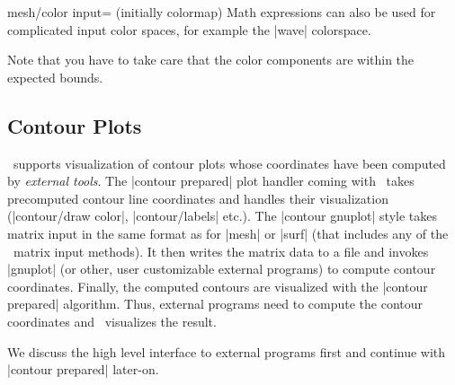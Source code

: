 {{\begin{pgfplotskey}{mesh/color input= (initially colormap)}
Math expressions can also be used for complicated input color spaces, for example the |wave| colorspace.
\begin{codeexample}[]
\end{codeexample}

Note that you have to take care that the color components are within the expected bounds.
\end{pgfplotskey}

}

\subsection{Contour Plots}
{
%
%
\PGFPlots\ supports visualization of contour plots whose coordinates have been computed by \emph{external tools}. The |contour prepared| plot handler coming with \PGFPlots\ takes precomputed contour line coordinates and handles their visualization (|contour/draw color|, |contour/labels| etc.). The |contour gnuplot| style takes matrix input in the same format as for |mesh| or |surf| (that includes any of the \PGFPlots\ matrix input methods). It then writes the matrix data to a file and invokes |gnuplot| (or other, user customizable external programs) to compute contour coordinates. Finally, the computed contours are visualized with the |contour prepared| algorithm. Thus, external programs need to compute the contour coordinates and \PGFPlots\ visualizes the result.

We discuss the high level interface to external programs first and continue with |contour prepared| later-on.

}}
